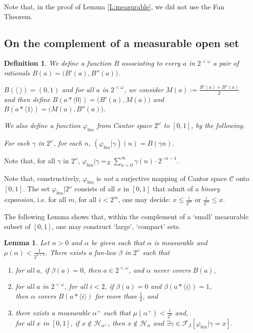 \documentclass[a4paper]{amsart}
\theoremstyle{plain}
\newtheorem{lemma}[theorem]{Lemma}
\newtheorem{definition}{Definition}
\begin{document}
   Note that, in the proof of Lemma \ref{L:measurable}, we did not use the Fan Theorem.
  \subsection{On the complement of a measurable open set}
  
  
  
 \begin{definition}\label{D:varphibin} We define a function $B$ associating to every  $a$ in $2^{<\omega}$  a pair of rationals $B(a)= \bigl(B'(a)
  , B''(a)\bigr)$. 
  
  $B(\langle\;\rangle)=(0,1)$ and for all $a$ in $2^{<\omega}$, we consider $M(a):=\frac{B'(a)+B''(a)}{2}$ and then define $B(a\ast\langle 0 \rangle)= \bigl(B'(a) , M(a)\bigr)$ and $B(a\ast\langle 1 \rangle)= \bigl(M(a), B''(a)\bigr)$.
  
 \smallskip We also define a function $\varphi_{bin}$ from Cantor space $2^\omega$ to $[0,1]$, by the following. 
 
 For each $\gamma$ in $2^\omega$, for each $n$, $(\varphi_{bin}|\gamma)(n) = B(\overline \gamma n)$. \end{definition}
 
  Note that, for all $\gamma$ in $2^\omega$, $\varphi_{bin}|\gamma =_\mathcal{R} \sum_{n=0}^\infty \gamma(n)\cdot 2^{-n-1}$.  
 
 \smallskip Note that, constructively, $\varphi_{bin}$ is {\it not} a surjective mapping of Cantor space $\mathcal{C}$ onto $[0,1]$. The set $\varphi_{bin}|2^\omega$ consists of all $x$ in $[0,1]$ that admit of a {\it binary expansion}, i.e. for all $m$, for all $i<2^m$, one may decide: $x\le \frac{i}{2^m}$ or $\frac{i}{2^m} \le x$. 
 
 
 The following Lemma shows that, within the complement of a `small'  measurable subset of $[0,1]$, one may construct `large',   `compact' sets. 
 \begin{lemma}\label{L:complopen}  Let $n>0$ and $ \alpha$ be given such that $\alpha$ is measurable and $\mu(\alpha)<\frac{1}{2^{n+2}}$. There exists a 
 fan-law $\beta$ in $2^\omega$ such that \begin{enumerate} \item for all $a$, if $\beta(a)=0$, then $a \in 2^{<\omega}$, and $\alpha$ never covers $B(a)$,  \item  for all $a$ in $2^{<\omega}$, for all $i<2$, if $\beta(a)= 0$ and $\beta(a\ast\langle i \rangle)=1$, \\then $\alpha$ covers $B(a\ast \langle i \rangle)$ for more than $\frac{1}{2}$, and \item there exists a measurable $\alpha^+$ such that  $\mu(\alpha^+)<\frac{1}{2^n}$ and, \\for all $x$ in $[0,1]$, if $x\notin \mathcal{H}_{\alpha^+}$, then  $x \notin \mathcal{H}_\alpha$ and $\exists \gamma \in \mathcal{F}_\beta[\varphi_{bin}|\gamma = x]$. \end{enumerate}\end{lemma}
 
\end{document}
